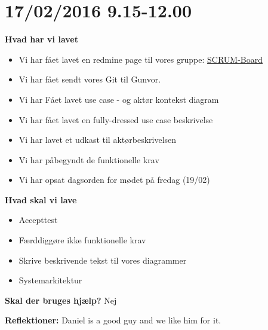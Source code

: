 \documentclass{article}
\begin{document}
	\section{17/02/2016 9.15-12.00}
	\textbf{Hvad har vi lavet}
	\begin{itemize}
		\item Vi har fået lavet en redmine page til vores gruppe: \href{https://redmine.iha.dk/c3prj3_f16/projects/scrum-board/wiki}{SCRUM-Board}
		\item Vi har fået sendt vores Git til Gunvor.
		\item Vi har Fået lavet use case - og aktør kontekst diagram
		\item Vi har fået lavet en fully-dressed use case beskrivelse
		\item Vi har lavet et udkast til aktørbeskrivelsen
		\item Vi har påbegyndt de funktionelle krav
		\item Vi har opsat dagsorden for mødet på fredag (19/02)
	\end{itemize}
	
	\textbf{Hvad skal vi lave}
	\begin{itemize}
		\item Accepttest
		\item Færddiggøre ikke funktionelle krav
		\item Skrive beskrivende tekst til vores diagrammer
		\item Systemarkitektur
	\end{itemize}
	
	\textbf{Skal der bruges hjælp?}
	Nej
	
	\textbf{Reflektioner:}
	Daniel is a good guy and we like him for it.
	
	
\end{document}
